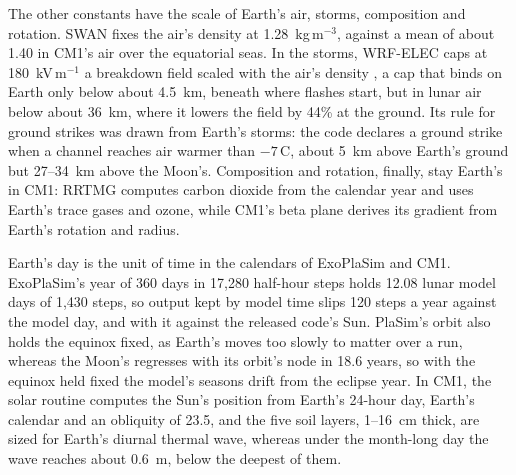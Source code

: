The other constants have the scale of Earth's air, storms, composition and rotation. SWAN fixes the air's density
at 1.28~kg\,m$^{-3}$, against a mean of about 1.40 in CM1's air over the equatorial seas. In the
storms, WRF-ELEC caps at 180~kV\,m$^{-1}$ a breakdown field scaled with the air's density
\autocite{dwyer2003fundamental}, a cap that binds on Earth only below about 4.5~km, beneath where flashes start,
but in lunar air below about 36~km, where it lowers the field by 44\% at the ground. Its rule for ground strikes was
drawn from Earth's storms: the code declares a ground strike when a channel reaches air warmer than
$-7$\,\textdegree C, about 5~km above Earth's ground but 27--34~km above the Moon's. Composition and rotation, finally, stay Earth's in CM1:
RRTMG computes carbon dioxide from the calendar year and uses Earth's trace gases and ozone, while CM1's beta plane
derives its gradient from Earth's rotation and radius.

Earth's day is the unit of time in the calendars of ExoPlaSim and CM1. ExoPlaSim's year of 360 days in 17,280 half-hour steps
holds 12.08 lunar model days of 1,430 steps, so output kept by model time slips 120 steps a year against the
model day, and with it against the released code's Sun. PlaSim's orbit also holds the equinox fixed, as
Earth's moves too slowly to matter over a run, whereas the Moon's regresses with its orbit's node in 18.6 years, so
with the equinox held fixed the model's seasons drift from the eclipse year. In CM1, the solar routine computes the Sun's position from Earth's 24-hour day, Earth's calendar and an obliquity of 23.5\textdegree, and the five soil layers, 1--16~cm thick, are sized for Earth's diurnal thermal wave, whereas under the month-long day the wave reaches about 0.6~m, below the deepest of them.

